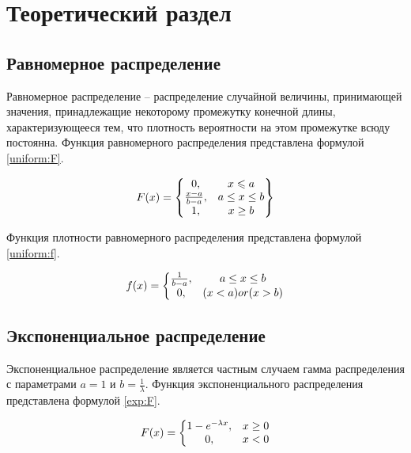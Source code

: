 \chapter{Теоретический раздел}

\section{Равномерное распределение}

Равномерное распределение -- распределение случайной величины, принимающей значения, принадлежащие некоторому промежутку конечной длины, характеризующееся тем, что плотность вероятности на этом промежутке всюду постоянна. Функция равномерного распределения представлена формулой \ref{uniform:F}.

\begin{equation}\label{uniform:F}
F(x) = \begin{Bmatrix}
$$
	0, & x\leqslant a \\
	\frac{x - a}{b - a}, & a\leq x\leq b \\
	1, & x\geq b
$$
\end{Bmatrix}
\end{equation}

Функция плотности равномерного распределения представлена формулой \ref{uniform:f}.

\begin{equation}\label{uniform:f}
f(x) = \left\{\begin{matrix}
$$
	\frac{1}{b - a}, & a\leq x\leq b \\
	0, & (x < a) or (x > b)
$$
\end{matrix}\right.
\end{equation}

\section{Экспоненциальное распределение}

Экспоненциальное распределение является частным случаем гамма распределения с параметрами $a = 1$ и  $b = \frac{1}{\lambda}$.
Функция экспоненциального распределения представлена формулой \ref{exp:F}.

\begin{equation}\label{exp:F}
F(x) = \left\{\begin{matrix}
$$
1 - e^{-\lambda x}, & x \geq 0 \\
0, & x < 0
$$
\end{matrix}\right.
\end{equation} 

